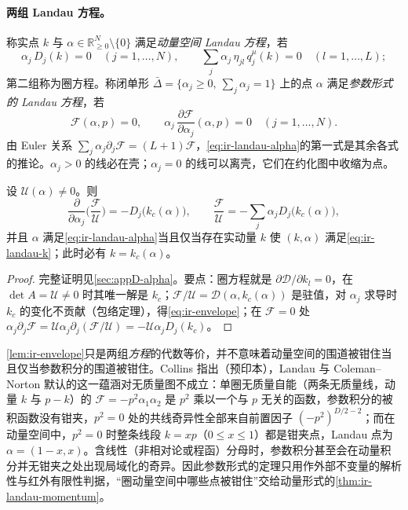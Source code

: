 \paragraph{两组 Landau 方程。}
称实点 $k$ 与 $\alpha\in\mathbb R^N_{\ge0}\setminus\{0\}$ 满足\emph{动量空间 Landau 方程}，若
\begin{equation}\label{eq:ir-landau-k}
\alpha_j\,D_j(k)=0\quad(j=1,\dots,N),\qquad
\sum_j\alpha_j\,\eta_{jl}\,q_j^\mu(k)=0\quad(l=1,\dots,L);
\end{equation}
第二组称为圈方程。称闭单形 $\bar\Delta=\{\alpha_j\ge0,\ \sum_j\alpha_j=1\}$ 上的点 $\alpha$ 满足\emph{参数形式的 Landau 方程}，若
\begin{equation}\label{eq:ir-landau-alpha}
\mathcal F(\alpha,p)=0,\qquad \alpha_j\,\frac{\partial\mathcal F}{\partial\alpha_j}(\alpha,p)=0\quad(j=1,\dots,N).
\end{equation}
由 Euler 关系 $\sum_j\alpha_j\partial_j\mathcal F=(L+1)\mathcal F$，\cref{eq:ir-landau-alpha}的第一式是其余各式的推论。$\alpha_j>0$ 的线必在壳；$\alpha_j=0$ 的线可以离壳，它们在约化图中收缩为点。

\begin{lemma}[包络恒等式]\label{lem:ir-envelope}
设 $\mathcal U(\alpha)\ne0$。则
\begin{equation}\label{eq:ir-envelope}
\frac{\partial}{\partial\alpha_j}\Big(\frac{\mathcal F}{\mathcal U}\Big)=-D_j\big(k_c(\alpha)\big),\qquad
\frac{\mathcal F}{\mathcal U}=-\sum_j\alpha_jD_j\big(k_c(\alpha)\big),
\end{equation}
并且 $\alpha$ 满足\cref{eq:ir-landau-alpha}当且仅当存在实动量 $k$ 使 $(k,\alpha)$ 满足\cref{eq:ir-landau-k}；此时必有 $k=k_c(\alpha)$。
\end{lemma}
\begin{proof}
完整证明见\cref{sec:appD-alpha}。要点：圈方程就是 $\partial\mathcal D/\partial k_l=0$，在 $\det A=\mathcal U\ne0$ 时其唯一解是 $k_c$；$\mathcal F/\mathcal U=\mathcal D(\alpha,k_c(\alpha))$ 是驻值，对 $\alpha_j$ 求导时 $k_c$ 的变化不贡献（包络定理），得\cref{eq:ir-envelope}；在 $\mathcal F=0$ 处 $\alpha_j\partial_j\mathcal F=\mathcal U\alpha_j\partial_j(\mathcal F/\mathcal U)=-\mathcal U\alpha_jD_j(k_c)$。
\end{proof}

\cref{lem:ir-envelope}只是两组\emph{方程}的代数等价，并不意味着动量空间的围道被钳住当且仅当参数积分的围道被钳住。Collins 指出（预印本）\cite[第~IV~节、附录~D]{Collins:2020euz}，Landau 与 Coleman--Norton 默认的这一蕴涵对无质量图不成立：单圈无质量自能（两条无质量线，动量 $k$ 与 $p-k$）的 $\mathcal F=-p^2\alpha_1\alpha_2$ 是 $p^2$ 乘以一个与 $p$ 无关的函数，参数积分的被积函数没有钳夹，$p^2=0$ 处的共线奇异性全部来自前置因子 $(-p^2)^{D/2-2}$；而在动量空间中，$p^2=0$ 时整条线段 $k=xp$（$0\le x\le1$）都是钳夹点，Landau 点为 $\alpha=(1-x,x)$。含线性（非相对论或程函）分母时，参数积分甚至会在动量积分并无钳夹之处出现局域化的奇异\cite[附录~D.2]{Collins:2020euz}。因此参数形式的定理只用作外部不变量的解析性与红外有限性判据，“圈动量空间中哪些点被钳住”交给动量形式的\cref{thm:ir-landau-momentum}。

